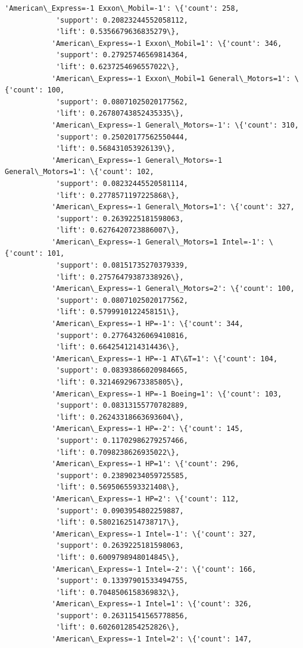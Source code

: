 \documentclass[11pt]{article}
\begin{document}
\begin{Verbatim}[commandchars=\\\{\}]
           'American\_Express=-1 Exxon\_Mobil=-1': \{'count': 258,
            'support': 0.20823244552058112,
            'lift': 0.5356679636835279\},
           'American\_Express=-1 Exxon\_Mobil=1': \{'count': 346,
            'support': 0.27925746569814364,
            'lift': 0.6237254696557022\},
           'American\_Express=-1 Exxon\_Mobil=1 General\_Motors=1': \{'count': 100,
            'support': 0.08071025020177562,
            'lift': 0.26780743852435335\},
           'American\_Express=-1 General\_Motors=-1': \{'count': 310,
            'support': 0.25020177562550444,
            'lift': 0.568431053926139\},
           'American\_Express=-1 General\_Motors=-1 General\_Motors=1': \{'count': 102,
            'support': 0.08232445520581114,
            'lift': 0.2778571197225868\},
           'American\_Express=-1 General\_Motors=1': \{'count': 327,
            'support': 0.2639225181598063,
            'lift': 0.6276420723886007\},
           'American\_Express=-1 General\_Motors=1 Intel=-1': \{'count': 101,
            'support': 0.08151735270379339,
            'lift': 0.27576479387338926\},
           'American\_Express=-1 General\_Motors=2': \{'count': 100,
            'support': 0.08071025020177562,
            'lift': 0.5799910122458151\},
           'American\_Express=-1 HP=-1': \{'count': 344,
            'support': 0.27764326069410816,
            'lift': 0.6642541214314436\},
           'American\_Express=-1 HP=-1 AT\&T=1': \{'count': 104,
            'support': 0.08393866020984665,
            'lift': 0.32146929673385805\},
           'American\_Express=-1 HP=-1 Boeing=1': \{'count': 103,
            'support': 0.08313155770782889,
            'lift': 0.26243318663693604\},
           'American\_Express=-1 HP=-2': \{'count': 145,
            'support': 0.11702986279257466,
            'lift': 0.7098238626935022\},
           'American\_Express=-1 HP=1': \{'count': 296,
            'support': 0.23890234059725585,
            'lift': 0.5695065593321408\},
           'American\_Express=-1 HP=2': \{'count': 112,
            'support': 0.0903954802259887,
            'lift': 0.5802162514738717\},
           'American\_Express=-1 Intel=-1': \{'count': 327,
            'support': 0.2639225181598063,
            'lift': 0.6009798948014845\},
           'American\_Express=-1 Intel=-2': \{'count': 166,
            'support': 0.13397901533494755,
            'lift': 0.7048506158369832\},
           'American\_Express=-1 Intel=1': \{'count': 326,
            'support': 0.26311541565778856,
            'lift': 0.6026012854252826\},
           'American\_Express=-1 Intel=2': \{'count': 147,

\end{Verbatim}
\end{document}
